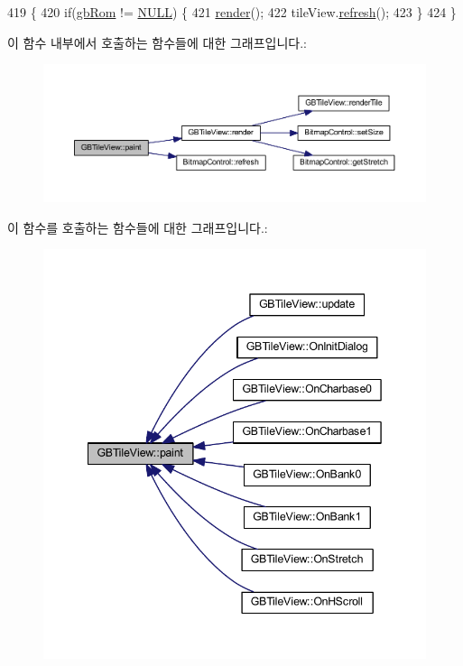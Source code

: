 \begin{DoxyCode}
419 \{
420   \textcolor{keywordflow}{if}(\mbox{\hyperlink{gb_globals_8cpp_ae4f6bd8162474dbcfdbc54c36d7f5695}{gbRom}} != \mbox{\hyperlink{getopt1_8c_a070d2ce7b6bb7e5c05602aa8c308d0c4}{NULL}}) \{
421     \mbox{\hyperlink{class_g_b_tile_view_a1012b77fed7304d7b27b9d619472e6a7}{render}}();
422     tileView.\mbox{\hyperlink{class_bitmap_control_acf061a1e9a4cad90ad2827c14f79caa2}{refresh}}();
423   \}
424 \}
\end{DoxyCode}
이 함수 내부에서 호출하는 함수들에 대한 그래프입니다.\+:
\nopagebreak
\begin{figure}[H]
\begin{center}
\leavevmode
\includegraphics[width=350pt]{class_g_b_tile_view_aa78a471956e777509644a0a04bab2c4d_cgraph}
\end{center}
\end{figure}
이 함수를 호출하는 함수들에 대한 그래프입니다.\+:
\nopagebreak
\begin{figure}[H]
\begin{center}
\leavevmode
\includegraphics[width=342pt]{class_g_b_tile_view_aa78a471956e777509644a0a04bab2c4d_icgraph}
\end{center}
\end{figure}
\mbox{\label{class_g_b_tile_view_a2bc3fcd50b001a8c3ed3a592772eeb8b}} 
